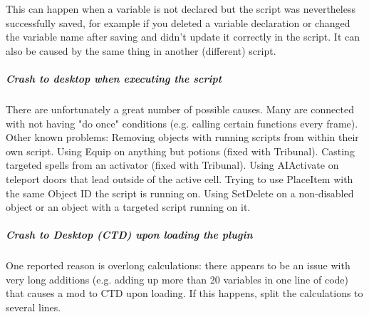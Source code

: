 This can happen when a variable is not declared but the script was
nevertheless successfully saved, for example if you deleted a variable
declaration or changed the variable name after saving and didn't update
it correctly in the script. It can also be caused by the same thing in
another (different) script.

\hypertarget{crash-to-desktop-when-executing-the-script}{%
\subparagraph{Crash to desktop when executing the
script}\label{crash-to-desktop-when-executing-the-script}}

There are unfortunately a great number of possible causes. Many are
connected with not having "do once" conditions (e.g. calling certain
functions every frame). Other known problems: Removing objects with
running scripts from within their own script. Using Equip on anything
but potions (fixed with Tribunal). Casting targeted spells from an
activator (fixed with Tribunal). Using AIActivate on teleport doors that
lead outside of the active cell. Trying to use PlaceItem with the same
Object ID the script is running on. Using SetDelete on a non-disabled
object or an object with a targeted script running on it.

\hypertarget{crash-to-desktop-ctd-upon-loading-the-plugin}{%
\subparagraph{\texorpdfstring{Crash to Desktop (CTD) upon loading the
plugin
}{Crash to Desktop (CTD) upon loading the plugin }}\label{crash-to-desktop-ctd-upon-loading-the-plugin}}

One reported reason is overlong calculations: there appears to be an
issue with very long additions (e.g. adding up more than 20 variables in
one line of code) that causes a mod to CTD upon loading. If this
happens, split the calculations to several lines.

